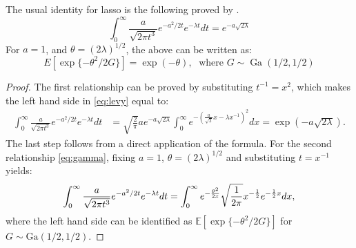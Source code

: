 \documentclass[letterpaper,11pt]{article}
\begin{document}
\begin{remark}
The usual identity for lasso is the following proved by \citet{levy1940certains}.
\begin{equation}
  \int_{0}^{\infty} \frac{a}{\sqrt{2\pi t^3}} e^{-a^2/2t} e^{-\lambda t} dt = e^{-a\sqrt{2\lambda}} \label{eq:levy}
\end{equation}
For $a = 1$, and $\theta = (2\lambda)^{1/2}$, the above can be written as: 
\begin{equation}
  E \left[\exp\{-\theta^2/2 G \} \right] = \exp(-\theta), \; \text{ where } G \sim \operatorname{Ga} (1/2, 1/2) \label{eq:gamma}
\end{equation}
\end{remark}
\begin{proof}
The first relationship can be proved by substituting $t^{-1} = x^2$, which makes the left hand side in \eqref{eq:levy} equal to: 
\begin{align*}
\int_{0}^{\infty} \frac{a}{\sqrt{2\pi t^3}} e^{-a^2/2t} e^{-\lambda t} dt & = \sqrt{\frac{2}{\pi}} a e^{-a\sqrt{2\lambda}} \int_0^{\infty} e^{-\left(\frac{a}{\sqrt{2}} x - \lambda x^{-1}\right)^2} dx = \exp(-a\sqrt{2\lambda}).
\end{align*}
The last step follows from a direct application of the \CS formula. For the second relationship \eqref{eq:gamma}, fixing $a = 1$, $\theta = (2\lambda)^{1/2}$ and substituting $t = x^{-1}$ yields: 
$$
\int_{0}^{\infty} \frac{a}{\sqrt{2\pi t^3}} e^{-a^2/2t} e^{-\lambda t} dt = \int_{0}^{\infty} e^{-\frac{\theta^2}{2x}} \sqrt{\frac{1}{2\pi}} x^{-\frac{1}{2}} e^{-\frac{1}{2} x} dx, 
$$
where the left hand side can be identified as $\mathbb{E} \left[\exp\{-\theta^2/2 G \} \right]$ for $G \sim \mbox{Ga}(1/2,1/2)$. \qedhere
\end{proof}
\end{document}
